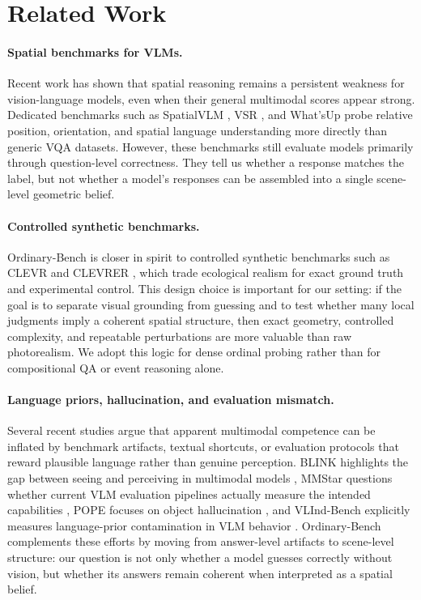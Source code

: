 \section{Related Work}
\label{sec:related}

\paragraph{Spatial benchmarks for VLMs.}
Recent work has shown that spatial reasoning remains a persistent weakness for vision-language models, even when their general multimodal scores appear strong. Dedicated benchmarks such as SpatialVLM \cite{chen2024spatialvlm}, VSR \cite{liu2023vsr}, and What'sUp \cite{kamath2023whatsup} probe relative position, orientation, and spatial language understanding more directly than generic VQA datasets. However, these benchmarks still evaluate models primarily through question-level correctness. They tell us whether a response matches the label, but not whether a model's responses can be assembled into a single scene-level geometric belief.

\paragraph{Controlled synthetic benchmarks.}
Ordinary-Bench is closer in spirit to controlled synthetic benchmarks such as CLEVR and CLEVRER \cite{johnson2017clevr,yi2020clevrer}, which trade ecological realism for exact ground truth and experimental control. This design choice is important for our setting: if the goal is to separate visual grounding from guessing and to test whether many local judgments imply a coherent spatial structure, then exact geometry, controlled complexity, and repeatable perturbations are more valuable than raw photorealism. We adopt this logic for dense ordinal probing rather than for compositional QA or event reasoning alone.

\paragraph{Language priors, hallucination, and evaluation mismatch.}
Several recent studies argue that apparent multimodal competence can be inflated by benchmark artifacts, textual shortcuts, or evaluation protocols that reward plausible language rather than genuine perception. BLINK highlights the gap between seeing and perceiving in multimodal models \cite{fu2024blink}, MMStar questions whether current VLM evaluation pipelines actually measure the intended capabilities \cite{chen2024mmstar}, POPE focuses on object hallucination \cite{li2023pope}, and VLInd-Bench explicitly measures language-prior contamination in VLM behavior \cite{lee2025vlind}. Ordinary-Bench complements these efforts by moving from answer-level artifacts to scene-level structure: our question is not only whether a model guesses correctly without vision, but whether its answers remain coherent when interpreted as a spatial belief.

